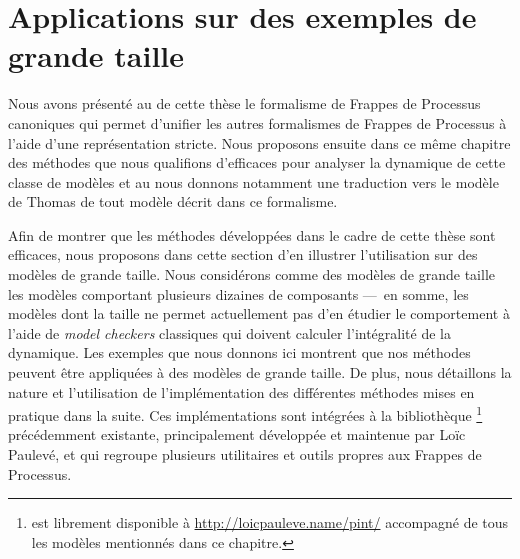 
\chapter{Applications sur des exemples de grande taille}


Nous avons présenté au  de cette thèse le formalisme de Frappes de Processus
canoniques qui permet d'unifier les autres formalismes de Frappes de Processus
à l'aide d'une représentation stricte.
Nous proposons ensuite dans ce même chapitre des méthodes que nous qualifions d'efficaces pour
analyser la dynamique de cette classe de modèles %
et au  nous donnons notamment une traduction vers le modèle de Thomas
de tout modèle décrit dans ce formalisme.

Afin de montrer que les méthodes développées dans le cadre de cette thèse sont efficaces,
nous proposons dans cette section d'en illustrer l'utilisation sur des modèles
de grande taille.
Nous considérons comme des modèles de grande taille les modèles comportant plusieurs
dizaines de composants
---~en somme, les modèles dont la taille ne permet actuellement pas d'en étudier
le comportement à l'aide de \textit{model checkers} classiques
qui doivent calculer l'intégralité de la dynamique.
Les exemples que nous donnons ici montrent que nos méthodes peuvent être
appliquées à des modèles de grande taille.
De plus, nous détaillons la nature et l'utilisation de l'implémentation
des différentes méthodes mises en pratique dans la suite.
Ces implémentations sont intégrées à la bibliothèque \Pint%
\footnote{\Pint{} est librement disponible à \url{http://loicpauleve.name/pint/}
accompagné de tous les modèles mentionnés dans ce chapitre.}
précédemment existante, principalement développée et maintenue par Loïc Paulevé,
et qui regroupe plusieurs utilitaires et outils propres aux Frappes de Processus.

